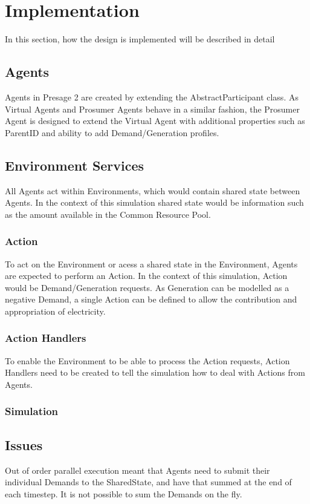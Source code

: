 \chapter{Implementation}
\label{Implementation}
In this section, how the design is implemented will be described in detail

\section*{Agents}
Agents in Presage 2 are created by extending the AbstractParticipant class. As Virtual Agents and Prosumer Agents behave in a similar fashion, the Prosumer Agent is designed to extend the Virtual Agent with additional properties such as ParentID and ability to add Demand/Generation profiles.

\section*{Environment Services}
All Agents act within Environments, which would contain shared state between Agents. In the context of this simulation shared state would be information such as the amount available in the Common Resource Pool.

\subsection*{Action}
To act on the Environment or acess a shared state in the Environment, Agents are expected to perform an Action. In the context of this simulation, Action would be Demand/Generation requests. As Generation can be modelled as a negative Demand, a single Action can be defined to allow the contribution and appropriation of electricity. 

\subsection*{Action Handlers} %
To enable the Environment to be able to process the Action requests, Action Handlers need to be created to tell the simulation how to deal with Actions from Agents.


\subsection*{Simulation}


\section*{Issues}
Out of order parallel execution meant that Agents need to submit their individual Demands to the SharedState, and have that summed at the end of each timestep. It is not possible to sum the Demands on the fly.

